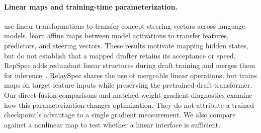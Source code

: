 \paragraph{Linear maps and training-time parameterization.}
\citet{huang2025cross} use linear transformations to transfer concept-steering vectors across language models. \citet{chen2025stitching} learn affine maps between model activations to transfer features, predictors, and steering vectors. These results motivate mapping hidden states, but do not establish that a mapped drafter retains its acceptance or speed. RepSpec adds redundant linear structures during draft training and merges them for inference~\citep{huo2026repspec}. RelaySpec shares the use of mergeable linear operations, but trains maps on target-feature inputs while preserving the pretrained draft transformer. Our direct-fusion comparisons and matched-weight gradient diagnostics examine how this parameterization changes optimization. They do not attribute a trained checkpoint's advantage to a single gradient measurement. We also compare against a nonlinear map to test whether a linear interface is sufficient.
